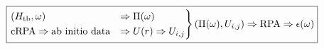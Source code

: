 \begin{equation}
    \boxed{\begin{rcases}
    (H_{\text{tb}},\omega) &\Rightarrow \Pi(\omega)\\
    \text{cRPA} \Rightarrow \text{ab initio data} &\Rightarrow U(r) \Rightarrow U_{i,j}
    \end{rcases} (\Pi(\omega),U_{i,j}) \Rightarrow \text{RPA} \Rightarrow \epsilon(\omega) }
\end{equation}

